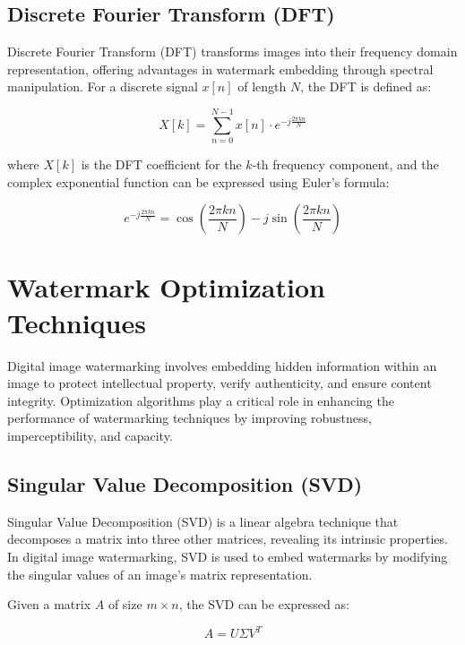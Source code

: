 \subsection{Discrete Fourier Transform (DFT)}

Discrete Fourier Transform (DFT) transforms images into their frequency domain representation, offering advantages in watermark embedding through spectral manipulation. For a discrete signal $x[n]$ of length $N$, the DFT is defined as:

\begin{equation}
X[k] = \sum_{n=0}^{N-1} x[n] \cdot e^{-j\frac{2\pi kn}{N}}
\end{equation}

where $X[k]$ is the DFT coefficient for the $k$-th frequency component, and the complex exponential function can be expressed using Euler's formula:

\begin{equation}
e^{-j\frac{2\pi kn}{N}} = \cos\left(\frac{2\pi kn}{N}\right) - j \sin\left(\frac{2\pi kn}{N}\right)
\end{equation}

\section{Watermark Optimization Techniques}

Digital image watermarking involves embedding hidden information within an image to protect intellectual property, verify authenticity, and ensure content integrity. Optimization algorithms play a critical role in enhancing the performance of watermarking techniques by improving robustness, imperceptibility, and capacity.

\subsection{Singular Value Decomposition (SVD)}

Singular Value Decomposition (SVD) is a linear algebra technique that decomposes a matrix into three other matrices, revealing its intrinsic properties. In digital image watermarking, SVD is used to embed watermarks by modifying the singular values of an image's matrix representation.

Given a matrix $A$ of size $m \times n$, the SVD can be expressed as:

\begin{equation}
A = U\Sigma V^T
\end{equation}

